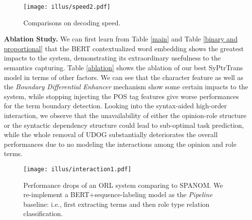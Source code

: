 \documentclass[letterpaper]{article} \usepackage{aaai22}  \usepackage{times}  \usepackage{helvet}  \usepackage{courier}  \usepackage[hyphens]{url}  \usepackage{graphicx} \urlstyle{rm} \def\UrlFont{\rm}  \usepackage{natbib}  \usepackage{caption} \DeclareCaptionStyle{ruled}{labelfont=normalfont,labelsep=colon,strut=off} \frenchspacing  \setlength{\pdfpagewidth}{8.5in}  \setlength{\pdfpageheight}{11in}  \usepackage{algorithm}
\begin{document}
\begin{figure}[!t]
\centering
\texttt{[image: illus/speed2.pdf]}
\caption{
Comparisons on decoding speed.
}
\label{speed}
\end{figure} 













\noindent\textbf{Ablation Study.}
We can first learn from Table \ref{main} and Table \ref{binary and proportional} that the BERT contextualized word embedding shows the greatest impacts to the system, demonstrating its extraordinary usefulness to the semantics capturing.
Table \ref{ablation} shows the ablation of our best SyPtrTrans model in terms of other factors.
We can see that the character feature as well as the \emph{Boundary Differential Enhancer} mechanism show some certain impacts to the system, while stopping injecting the POS tag features give worse performances for the term boundary detection.
Looking into the syntax-aided high-order interaction, we observe that the unavailability of either the opinion-role structure or the syntactic dependency structure could lead to sub-optimal task prediction, while the whole removal of UDOG substantially deteriorates the overall performances due to no modeling the interactions among the opinion and role terms.










\begin{figure}[!t]
\centering
\texttt{[image: illus/interaction1.pdf]}
\caption{
Performance drops of an ORL system comparing to S{\small PAN}OM.
We re-implement a BERT+sequence-labeling model as the \emph{Pipeline} baseline: i.e., first extracting terms and then role type relation classification.
}
\label{interaction}
\end{figure}
\end{document}
